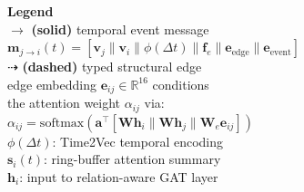 \documentclass[runningheads]{llncs}
\begin{document}
\begin{figure}[ht]
\begin{minipage}[c]{0.60\linewidth}
\end{minipage}
\hfill
\begin{minipage}[c]{0.36\linewidth}
{\scriptsize
\textbf{Legend}\\[3pt]
\(\longrightarrow\) \textbf{(solid)} temporal event message\\
\quad\(\mathbf{m}_{j\to i}(t)=[\mathbf{v}_j\|\mathbf{v}_i\|\phi(\Delta t)\|\mathbf{f}_e\|\mathbf{e}_{\text{edge}}\|\mathbf{e}_{\text{event}}]\)\\[4pt]
\(\dashrightarrow\) \textbf{(dashed)} typed structural edge\\
\quad edge embedding \(\mathbf{e}_{ij}\in\mathbb{R}^{16}\) conditions\\
\quad the attention weight \(\alpha_{ij}\) via:\\
\quad\(\alpha_{ij}=\mathrm{softmax}(\mathbf{a}^{\top}[\mathbf{W}\mathbf{h}_i\|\mathbf{W}\mathbf{h}_j\|\mathbf{W}_e\mathbf{e}_{ij}])\)\\[4pt]
\(\phi(\Delta t)\): Time2Vec temporal encoding\\[2pt]
\(\mathbf{s}_i(t)\): ring-buffer attention summary\\[2pt]
\(\mathbf{h}_i\): input to relation-aware GAT layer
}
\end{minipage}


\end{figure}
\end{document}
